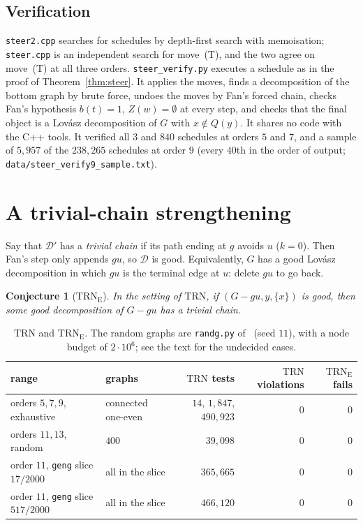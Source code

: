 \documentclass[11pt]{amsart}
\newtheorem{conjecture}[theorem]{Conjecture}
\theoremstyle{definition}
\newcommand{\cD}{\mathcal D}
\newcommand{\TRN}{\mathrm{TRN}}
\newcommand{\TRNE}{\mathrm{TRN}_{\mathrm E}}
\begin{document}
\subsection*{Verification} \texttt{steer2.cpp} searches for schedules by depth-first search with
memoisation; \texttt{steer.cpp} is an independent search for move~(T), and the two agree on
move~(T) at all three orders. \texttt{steer\_verify.py} executes a schedule as in the proof of
Theorem~\ref{thm:steer}. It applies the moves, finds a decomposition of the bottom graph by brute
force, undoes the moves by Fan's forced chain, checks Fan's hypothesis $b(t)=1$, $Z(w)=\emptyset$ at
every step, and checks that the final object is a Lov\'asz decomposition of $G$ with $x\notin Q(y)$.
It shares no code with the C++ tools. It verified all $3$ and $840$ schedules at orders $5$ and $7$,
and a sample of $5{,}957$ of the $238{,}265$ schedules at order $9$ (every $40$th in the order of
output; \texttt{data/steer\_verify9\_sample.txt}).

\section{A trivial-chain strengthening}\label{sec:trne}

Say that $\cD'$ has a \emph{trivial chain} if its path ending at $g$ avoids $u$ ($k=0$). Then Fan's
step only appends $gu$, so $\cD$ is good. Equivalently, $G$ has a good Lov\'asz decomposition in
which $gu$ is the terminal edge at $u$: delete $gu$ to go back.

\begin{conjecture}[$\TRNE$]\label{conj:trne}
In the setting of $\TRN$, if $(G-gu,y,\{x\})$ is good, then some good decomposition of $G-gu$ has a
trivial chain.
\end{conjecture}

\begin{table}[ht]
\caption{$\TRN$ and $\TRNE$. The random graphs are \texttt{randg.py} of~\cite{L1I} (seed $11$),
with a node budget of $2\cdot10^6$; see the text for the undecided cases.}\label{tab:trne}
\small
\begin{tabular}{@{}llrrr@{}}
\toprule
range & graphs & $\TRN$ tests & $\TRN$ violations & $\TRNE$ fails\\
\midrule
orders $5,7,9$, exhaustive & connected one-even & $14$, $1{,}847$, $490{,}923$ & $0$ & $0$\\
orders $11,13$, random & $400$ & $39{,}098$ & $0$ & $0$\\
order $11$, \texttt{geng} slice $17/2000$ & all in the slice & $365{,}665$ & $0$ & $0$\\
order $11$, \texttt{geng} slice $517/2000$ & all in the slice & $466{,}120$ & $0$ & $0$\\
\bottomrule
\end{tabular}
\end{table}
\end{document}
